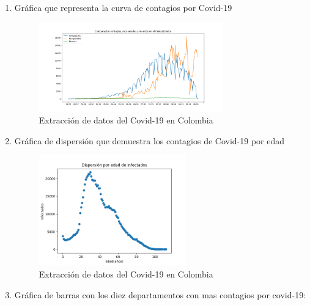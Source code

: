 \documentclass[conference,compsoc,onecolumn]{IEEEtran}
\begin{document}
 \begin{enumerate}
     \item Gráfica que representa la curva de contagios por Covid-19
     
                 \begin{figure}[H]
            \centering
            \includegraphics[width=0.75\textwidth]{Figures/CurvaContagios.png}
            \caption{Extracción de datos del Covid-19 en Colombia}
            \label{fig:grafica.png}
        \end{figure}
     
     \newpage
     \item Gráfica de dispersión que demuestra los contagios de Covid-19 por edad
     
                 \begin{figure}[H]
            \centering
            \includegraphics[width=0.6\textwidth]{Figures/InfectadosEdad.png}
            \caption{Extracción de datos del Covid-19 en Colombia}
            \label{fig:grafica.png}
        \end{figure}
     
     \singlespacing
    \item Gráfica de barras con los diez departamentos con mas contagios por covid-19:
     \singlespacing
     

\end{enumerate}
\end{document}
